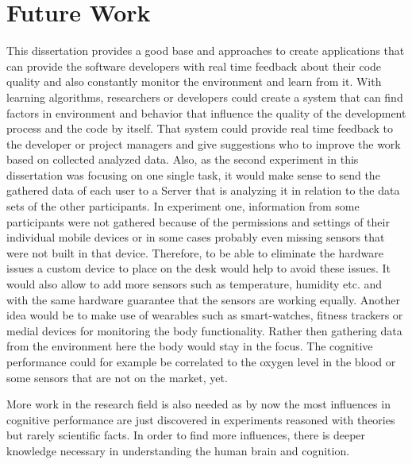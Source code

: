 \section{Future Work}
This dissertation provides a good base and approaches to create applications that can provide the software developers with real time feedback about their code quality and also constantly monitor the environment and learn from it. With learning algorithms, researchers or developers could create a system that can find factors in environment and behavior that influence the quality of the development process and the code by itself. That system could provide real time feedback to the developer or project managers and give suggestions who to improve the work based on collected analyzed data. 
Also, as the second experiment in this dissertation was focusing on one single task, it would make sense to send the gathered data of each user to a Server that is analyzing it in relation to the data sets of the other participants. 
In experiment one, information from some participants were not gathered because of the permissions and settings of their individual mobile devices or in some cases probably even missing sensors that were not built in that device. 
Therefore, to be able to eliminate the hardware issues a custom device to place on the desk would help to avoid these issues. It would also allow to add more sensors such as temperature, humidity etc. and with the same hardware guarantee that the sensors are working equally. 
Another idea would be to make use of wearables such as smart-watches, fitness trackers or medial devices for monitoring the body functionality. Rather then gathering data from the environment here the body would stay in the focus. The cognitive performance could for example be correlated to the oxygen level in the blood or some sensors that are not on the market, yet. 

More work in the research field is also needed as by now the most influences in cognitive performance are just discovered in experiments reasoned with theories but rarely scientific facts. In order to find more influences, there is deeper knowledge necessary in understanding the human brain and cognition. 

